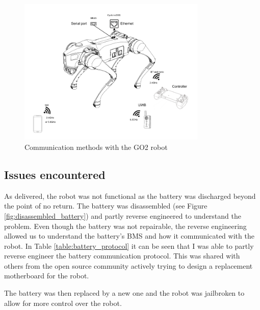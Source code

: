 \documentclass[11pt]{article}
\begin{document}
        \begin{figure}[H]
            \centering
            \includegraphics[width=0.8\textwidth]{Images/go2-communication.pdf}
            \caption{Communication methods with the GO2 robot}
            \label{fig:go2_communication}
        \end{figure}

        
    \subsection{Issues encountered}
        \label{section:go2_battery}
        As delivered, the robot was not functional as the battery was discharged beyond the point of no return. The battery was disassembled (see Figure \ref{fig:disassembled_battery}) and partly reverse engineered to understand the problem. Even though the battery was not repairable, the reverse engineering allowed us to understand the battery's BMS and how it communicated with the robot. In Table \ref{table:battery_protocol} it can be seen that I was able to partly reverse engineer the battery communication protocol. This was shared with others from the open source community actively trying to design a replacement motherboard for the robot. 
        
        The battery was then replaced by a new one and the robot was jailbroken to allow for more control over the robot.
        
\end{document}
